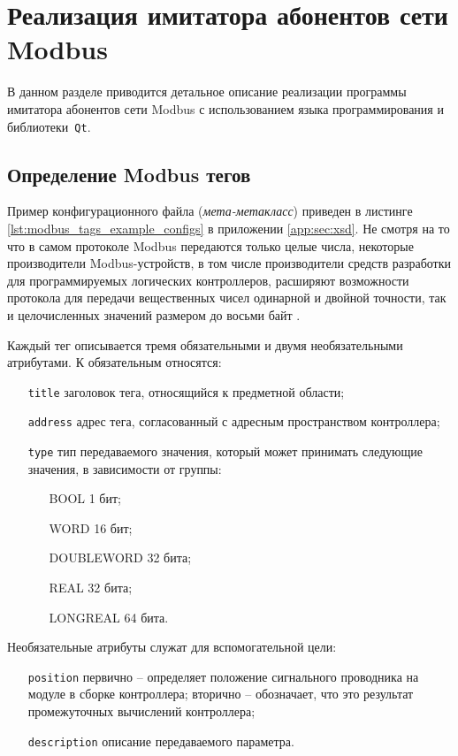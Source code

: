 \chapter{Реализация имитатора абонентов сети Modbus}
В данном разделе приводится детальное описание реализации программы имитатора абонентов сети Modbus
с использованием языка программирования \cpp и библиотеки~\texttt{Qt}.


\section{Определение Modbus тегов} \label{sec:modbus_tag}
Пример конфигурационного файла (\textit{мета-метакласс}) приведен в листинге \ref{lst:modbus_tags_example_configs} в приложении \ref{app:sec:xsd}.
Не смотря на то что в самом протоколе Modbus передаются только целые числа, некоторые производители Modbus-устройств,
в том числе производители средств разработки для программируемых логических контроллеров, расширяют возможности протокола
для передачи вещественных чисел одинарной и двойной точности, так и целочисленных значений размером до восьми байт \cite{book:gost:modbus_program_language}.

Каждый тег описывается тремя обязательными и двумя необязательными атрибутами.
К обязательным относятся:
\begin{itemize}
    \item[\texttt{title}] заголовок тега, относящийся к предметной области;
    \item[\texttt{address}] адрес тега, согласованный с адресным пространством контроллера;
    \item[\texttt{type}] тип передаваемого значения, который может принимать следующие значения, в зависимости от группы:
    \begin{itemize}
        \item[BOOL] 1 бит;
        \item[WORD] 16 бит;
        \item[DOUBLEWORD] 32 бита;
        \item[REAL] 32 бита;
        \item[LONGREAL] 64 бита.
    \end{itemize}
\end{itemize}
Необязательные атрибуты служат для вспомогательной цели:
\begin{itemize}
    \item[\texttt{position}] первично -- определяет положение сигнального проводника на модуле в сборке контроллера;
    вторично -- обозначает, что это результат промежуточных вычислений контроллера;
    \item[\texttt{description}] описание передаваемого параметра.
\end{itemize}

